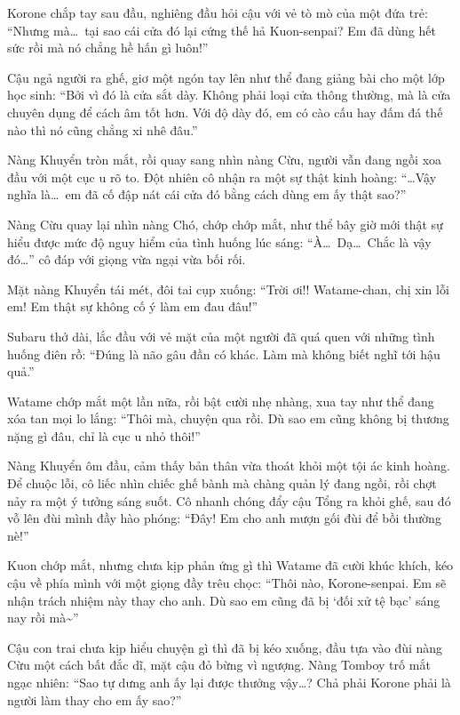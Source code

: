 \documentclass[../main.tex]{subfiles}
\begin{document}
Korone chắp tay sau đầu, nghiêng đầu hỏi cậu với vẻ tò mò của một đứa trẻ: ``Nhưng mà\dots\ tại sao cái cửa đó lại cứng thế hả Kuon-senpai? Em đã dùng hết sức rồi mà nó chẳng hề hấn gì luôn!''

Cậu ngả người ra ghế, giơ một ngón tay lên như thể đang giảng bài cho một lớp học sinh: ``Bởi vì đó là cửa sắt dày. Không phải loại cửa thông thường, mà là cửa chuyên dụng để cách âm tốt hơn. Với độ dày đó, em có cào cấu hay đấm đá thế nào thì nó cũng chẳng xi nhê đâu.''

Nàng Khuyển tròn mắt, rồi quay sang nhìn nàng Cừu, người vẫn đang ngồi xoa đầu với một cục u rõ to. Đột nhiên cô nhận ra một sự thật kinh hoàng: ``\dots Vậy nghĩa là\dots\ em đã cố đập nát cái cửa đó bằng cách dùng em ấy thật sao?''

Nàng Cừu quay lại nhìn nàng Chó, chớp chớp mắt, như thể bây giờ mới thật sự hiểu được mức độ nguy hiểm của tình huống lúc sáng: ``À\dots\ Dạ\dots\ Chắc là vậy đó\dots'' cô đáp với giọng vừa ngại vừa bối rối.

Mặt nàng Khuyển tái mét, đôi tai cụp xuống: ``Trời ơi!! Watame-chan, chị xin lỗi em! Em thật sự không cố ý làm em đau đâu!''

Subaru thở dài, lắc đầu với vẻ mặt của một người đã quá quen với những tình huống điên rồ: ``Đúng là não gâu đần có khác. Làm mà không biết nghĩ tới hậu quả.''

Watame chớp mắt một lần nữa, rồi bật cười nhẹ nhàng, xua tay như thể đang xóa tan mọi lo lắng: ``Thôi mà, chuyện qua rồi. Dù sao em cũng không bị thương nặng gì đâu, chỉ là cục u nhỏ thôi!''

Nàng Khuyển ôm đầu, cảm thấy bản thân vừa thoát khỏi một tội ác kinh hoàng. Để chuộc lỗi, cô liếc nhìn chiếc ghế bành mà chàng quản lý đang ngồi, rồi chợt nảy ra một ý tưởng sáng suốt. Cô nhanh chóng đẩy cậu Tổng ra khỏi ghế, sau đó vỗ lên đùi mình đầy hào phóng: ``Đây! Em cho anh mượn gối đùi để bồi thường nè!''

Kuon chớp mắt, nhưng chưa kịp phản ứng gì thì Watame đã cười khúc khích, kéo cậu về phía mình với một giọng đầy trêu chọc: ``Thôi nào, Korone-senpai. Em sẽ nhận trách nhiệm này thay cho anh. Dù sao em cũng đã bị `đối xử tệ bạc' sáng nay rồi mà\~{}''

Cậu con trai chưa kịp hiểu chuyện gì thì đã bị kéo xuống, đầu tựa vào đùi nàng Cừu một cách bất đắc dĩ, mặt cậu đỏ bừng vì ngượng. Nàng Tomboy trố mắt ngạc nhiên: ``Sao tự dưng anh ấy lại được thưởng vậy\dots? Chả phải Korone phải là người làm thay cho em ấy sao?''
\end{document}
